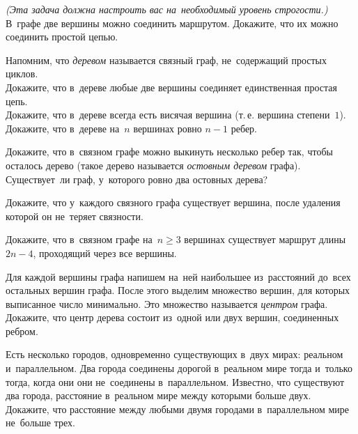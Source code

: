 \begin{problems}

\item
\emph{(Эта задача должна настроить вас на~необходимый уровень строгости.)}
В~графе две вершины можно соединить маршрутом.
Докажите, что их можно соединить простой цепью.



\item
Напомним, что \emph{деревом} называется связный граф, не~содержащий простых
циклов.
\\
\subproblem
Докажите, что в~дереве любые две вершины соединяет единственная простая цепь.
\\
\subproblem
Докажите, что в~дереве всегда есть висячая вершина
(т.\,е. вершина степени~$1$).
\\
\subproblem
Докажите, что в~дереве на~$n$ вершинах ровно $n - 1$ ребер.

\item
\subproblem
Докажите, что в~связном графе можно выкинуть несколько ребер так, чтобы
осталось дерево (такое дерево называется \emph{остовным деревом} графа).
\\
\subproblem
Существует~ли граф, у~которого ровно два остовных дерева?

\item
Докажите, что у~каждого связного графа существует вершина, после удаления
которой он не~теряет связности.

\item
Докажите, что в~связном графе на~$n \geq 3$ вершинах существует маршрут длины
$2 n - 4$, проходящий через все вершины.

\item
Для каждой вершины графа напишем на~ней наибольшее из~расстояний до~всех
остальных вершин графа.
После этого выделим множество вершин, для которых выписанное число минимально.
Это множество называется \emph{центром} графа.
Докажите, что центр дерева состоит из~одной или двух вершин, соединенных
ребром.

\item
Есть несколько городов, одновременно существующих в~двух мирах: реальном
и~параллельном.
Два города соединены дорогой в~реальном мире тогда и~только тогда, когда они
они не~соединены в~параллельном.
Известно, что существуют два города, расстояние в~реальном мире между которыми
больше двух.
Докажите, что расстояние между любыми двумя городами в~параллельном мире
не~больше трех.


\end{problems}
